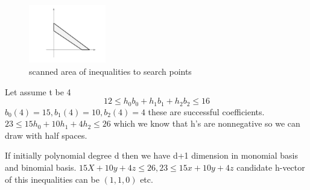\documentclass[12pt,twoside]{article}
\begin{document}
\begin{figure}[!h]
  \centering
          \includegraphics[width=0.30\textwidth]{scannedarea.png}
  \caption{scanned area of inequalities to search points}
\end{figure}
\newpage
\par
Let assume t be 4 \newline
\[ 12 \leq h_0b_0 + h_1b_1 + h_2b_2 \leq 16\]
$ b_0(4) = 15 , b_1(4) = 10, b_2(4) = 4$ these are successful coefficients.\newline
$23 \leq 15 h_0 + 10h_1 + 4h_2 \leq 26$ which we know that h's are nonnegative so we
can draw with half spaces.\newline
\par
If initially polynomial degree d then we have d+1 dimension in monomial basis and binomial basis.
${15X + 10y + 4z \leq 26 , 23 \leq 15x+ 10y + 4z }$ candidate h-vector of this
inequalities can be $(1,1,0)$ etc.
\newline
\end{document}
